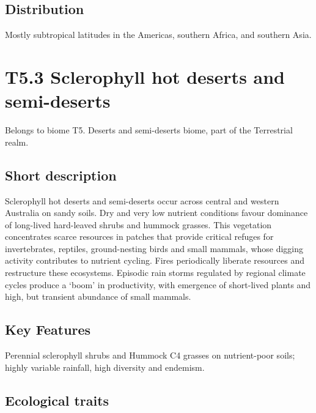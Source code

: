 \documentclass[
  letterpaper,
  DIV=11,
  numbers=noendperiod]{scrartcl}
\begin{document}
\subsection{Distribution}\label{distribution-89}

Mostly subtropical latitudes in the Americas, southern Africa, and
southern Asia.

\section{T5.3 Sclerophyll hot deserts and
semi-deserts}\label{t5.3-sclerophyll-hot-deserts-and-semi-deserts}

Belongs to biome T5. Deserts and semi-deserts biome, part of the
Terrestrial realm.

\subsection{Short description}\label{short-description-90}

Sclerophyll hot deserts and semi-deserts occur across central and
western Australia on sandy soils. Dry and very low nutrient conditions
favour dominance of long-lived hard-leaved shrubs and hummock grasses.
This vegetation concentrates scarce resources in patches that provide
critical refuges for invertebrates, reptiles, ground-nesting birds and
small mammals, whose digging activity contributes to nutrient cycling.
Fires periodically liberate resources and restructure these ecosystems.
Episodic rain storms regulated by regional climate cycles produce a
`boom' in productivity, with emergence of short-lived plants and high,
but transient abundance of small mammals.

\subsection{Key Features}\label{key-features-90}

Perennial sclerophyll shrubs and Hummock C4 grasses on nutrient-poor
soils; highly variable rainfall, high diversity and endemism.

\subsection{Ecological traits}\label{ecological-traits-90}
\end{document}
